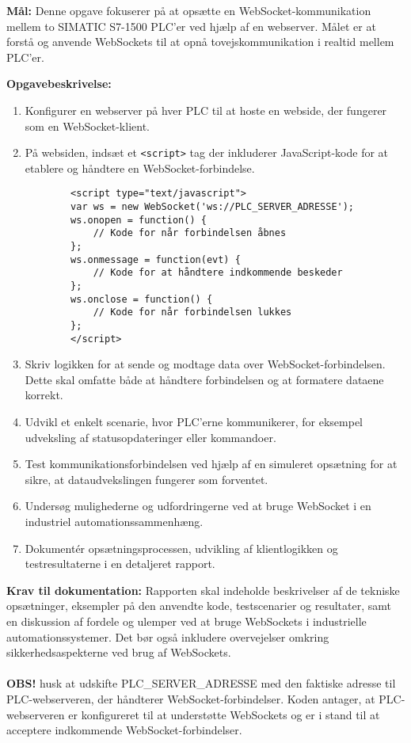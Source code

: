 \textbf{Mål:} Denne opgave fokuserer på at opsætte en WebSocket-kommunikation mellem to SIMATIC S7-1500 PLC'er ved hjælp af en webserver. Målet er at forstå og anvende WebSockets til at opnå tovejskommunikation i realtid mellem PLC'er.

\textbf{Opgavebeskrivelse:}
\begin{enumerate}
	\item Konfigurer en webserver på hver PLC til at hoste en webside, der fungerer som en WebSocket-klient.
	\item På websiden, indsæt et \texttt{<script>} tag der inkluderer JavaScript-kode for at etablere og håndtere en WebSocket-forbindelse.
	
	\begin{verbatim}
		<script type="text/javascript">
		var ws = new WebSocket('ws://PLC_SERVER_ADRESSE');
		ws.onopen = function() {
			// Kode for når forbindelsen åbnes
		};
		ws.onmessage = function(evt) {
			// Kode for at håndtere indkommende beskeder
		};
		ws.onclose = function() {
			// Kode for når forbindelsen lukkes
		};
		</script>
	\end{verbatim}
	
	\item Skriv logikken for at sende og modtage data over WebSocket-forbindelsen. Dette skal omfatte både at håndtere forbindelsen og at formatere dataene korrekt.
	\item Udvikl et enkelt scenarie, hvor PLC'erne kommunikerer, for eksempel udveksling af statusopdateringer eller kommandoer.
	\item Test kommunikationsforbindelsen ved hjælp af en simuleret opsætning for at sikre, at dataudvekslingen fungerer som forventet.
	\item Undersøg mulighederne og udfordringerne ved at bruge WebSocket i en industriel automationssammenhæng.
	\item Dokumentér opsætningsprocessen, udvikling af klientlogikken og testresultaterne i en detaljeret rapport.
\end{enumerate}
\textbf{Krav til dokumentation:} Rapporten skal indeholde beskrivelser af de tekniske opsætninger, eksempler på den anvendte kode, testscenarier og resultater, samt en diskussion af fordele og ulemper ved at bruge WebSockets i industrielle automationssystemer. Det bør også inkludere overvejelser omkring sikkerhedsaspekterne ved brug af WebSockets.
\\\\
\textbf{OBS!}
husk at udskifte PLC\_SERVER\_ADRESSE med den faktiske adresse til PLC-webserveren, der håndterer WebSocket-forbindelser. Koden antager, at PLC-webserveren er konfigureret til at understøtte WebSockets og er i stand til at acceptere indkommende WebSocket-forbindelser.

